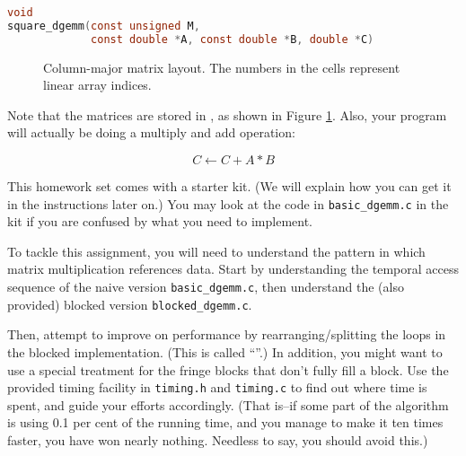 \documentclass[11pt]{article}
\begin{document}
\begin{lstlisting}[language=C]
void
square_dgemm(const unsigned M,
             const double *A, const double *B, double *C)
\end{lstlisting}

\begin{figure}

\begin{center}
\end{center}

\caption{Column-major matrix layout. The numbers in the cells
represent linear array indices.}
\label{fig:column-major}
\end{figure}

Note that the matrices are stored in
, as shown in Figure \ref{fig:column-major}.  Also, your
program will actually be doing a multiply and add operation:

\[
  C \leftarrow C + A*B
\]

This homework set comes with a starter kit. (We will explain how you
can get it in the instructions later on.) You may look at the code in
\verb|basic_dgemm.c| in the kit if you are confused by what you need
to implement.

To tackle this assignment, you will need to understand the pattern in
which matrix multiplication references data. Start by understanding
the temporal access sequence of the naive version
\verb|basic_dgemm.c|, then understand the (also provided) blocked
version \verb|blocked_dgemm.c|.

Then, attempt to improve on performance by rearranging/splitting the
loops in the blocked implementation.  (This is called
``''.)
In addition, you might want to use a special treatment for the fringe
blocks that don't fully fill a block. Use the provided timing facility
in \texttt{timing.h} and \texttt{timing.c} to find out where time is
spent, and guide your efforts accordingly. (That is--if some part of
the algorithm is using 0.1 per cent of the running time, and you
manage to make it ten times faster, you have won nearly nothing.
Needless to say, you should avoid this.)
\end{document}
